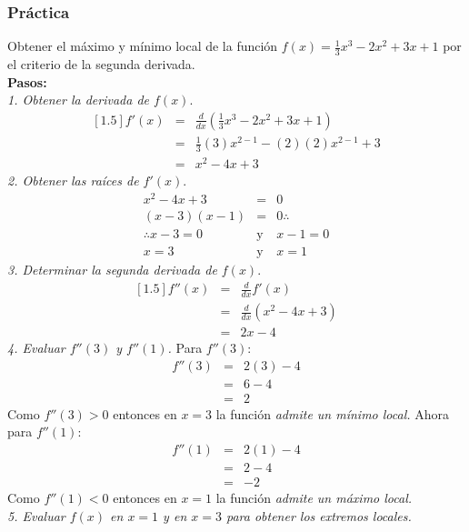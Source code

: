 \documentclass[letterpaper, 12pt]{article}
\begin{document}
    \subsubsection{Práctica}
    Obtener el máximo y mínimo local de la función \(f(x)=\frac{1}{3}x^3-2x^2+3x+1\) por el criterio de la segunda derivada.
    \\\newline\textbf{Pasos: }\\\newline
    \emph{1. Obtener la derivada de \(f(x)\)}.
    \[\begin{matrix}[1.5]
        f'(x)&=&\frac{d}{dx}\left(\frac{1}{3}x^3-2x^2+3x+1\right)\\
        &=&\frac{1}{3}(3)x^{2-1}-(2)(2)x^{2-1}+3\\
        &=&x^2-4x+3
    \end{matrix}\]
    \emph{2. Obtener las raíces de \(f'(x)\)}.
    \[\begin{matrix}
        x^2-4x+3&=&0\\
        (x-3)(x-1)&=&0\therefore\\
        \therefore x-3=0&\text{y}&x-1=0\\
        x=3&\text{y}&x=1
    \end{matrix}\]
    \emph{3. Determinar la segunda derivada de \(f(x)\)}.
    \[\begin{matrix}[1.5]
        f''(x)&=&\frac{d}{dx}f'(x)\\
            &=&\frac{d}{dx}(x^2-4x+3)\\
            &=&2x-4
    \end{matrix}\]
    \emph{4. Evaluar \(f''(3)\) y \(f''(1)\).}
    Para \(f''(3)\):
    \[\begin{matrix}
        f''(3)&=&2(3)-4\\
        &=&6-4\\
        &=&2
    \end{matrix}\]
    Como \(f''(3)>0\) entonces en \(x=3\) la función \emph{admite un mínimo local.} Ahora para \(f''(1)\):
    \[\begin{matrix}
        f''(1)&=&2(1)-4\\
            &=&2-4\\
            &=&-2
    \end{matrix}\]
    Como \(f''(1)<0\) entonces en \(x=1\) la función \emph{admite un máximo local.}
    \\\newline
    \emph{5. Evaluar \(f(x)\) en \(x=1\) y en \(x=3\) para obtener los extremos locales.}
\end{document}
